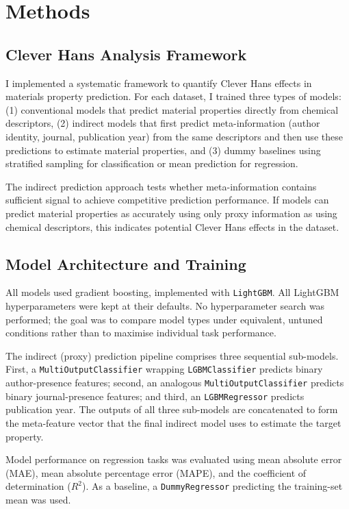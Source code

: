 \documentclass[11pt, oneside]{article}
\begin{document}
\section{Methods}

\subsection{Clever Hans Analysis Framework}

I implemented a systematic framework to quantify Clever Hans effects in materials property prediction. For each dataset, I trained three types of models: (1) conventional models that predict material properties directly from chemical descriptors, (2) indirect models that first predict meta-information (author identity, journal, publication year) from the same descriptors and then use these predictions to estimate material properties, and (3) dummy baselines using stratified sampling for classification or mean prediction for regression.

The indirect prediction approach tests whether meta-information contains sufficient signal to achieve competitive prediction performance. If models can predict material properties as accurately using only proxy information as using chemical descriptors, this indicates potential Clever Hans effects in the dataset.

\subsection{Model Architecture and Training}

All models used gradient boosting, implemented with \texttt{LightGBM}\autocite{lightgbm}. All LightGBM hyperparameters were kept at their defaults. No hyperparameter search was performed; the goal was to compare model types under equivalent, untuned conditions rather than to maximise individual task performance.

The indirect (proxy) prediction pipeline comprises three sequential sub-models. First, a \texttt{MultiOutputClassifier} wrapping \texttt{LGBMClassifier} predicts binary author-presence features; second, an analogous \texttt{MultiOutputClassifier} predicts binary journal-presence features; and third, an \texttt{LGBMRegressor} predicts publication year. The outputs of all three sub-models are concatenated to form the meta-feature vector that the final indirect model uses to estimate the target property.

Model performance on regression tasks was evaluated using mean absolute error (MAE), mean absolute percentage error (MAPE), and the coefficient of determination ($R^2$). As a baseline, a \texttt{DummyRegressor} predicting the training-set mean was used.
\end{document}
